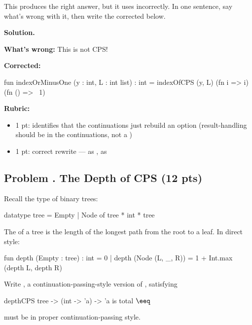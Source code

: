 \documentclass[crop=false]{standalone}
\newif\ifsol
\newenvironment{solution}
    {\par\color{solution_color}\begin{framed}\textbf{Solution.}\par}
    {\end{framed}}
\newcommand{\quizproblem}[3]{%
  \needspace{5\baselineskip}%
  \stepcounter{problem}%
  \ifsol
    \subsection*{Problem \arabic{problem}. #1 \hfill \timing{#2} \quad (#3 pts)}%
  \else
    \subsection*{Problem \arabic{problem}. #1 \hfill (#3 pts)}%
  \fi
}
\newcommand{\answerspace}[1]{\ifsol\else\vspace{#1}\par\fi}
\begin{document}
This produces the right answer, but it uses  incorrectly.
In one sentence, say what's wrong with it, then write the corrected
 below.

\answerspace{4.5cm}

\begin{solution}
\textbf{What's wrong:} This is not CPS!

\textbf{Corrected:}
\begin{codeblock}
  fun indexOrMinusOne (y : int, L : int list) : int =
    indexOfCPS (y, L) (fn i => i) (fn () => ~1)
\end{codeblock}

\textbf{Rubric:}
\begin{itemize}
  \item 1 pt: identifies that the continuations just rebuild an option
    (result-handling should be in the continuations, not a )
  \item 1 pt: correct rewrite ---  as ,
     as 
\end{itemize}
\end{solution}


\quizproblem{The Depth of CPS}{10}{12}

Recall the type of binary trees:

\begin{codeblock}
  datatype tree = Empty | Node of tree * int * tree
\end{codeblock}

The  of a tree is the length of the longest path from the root
to a leaf. In direct style:

\begin{codeblock}
  fun depth (Empty : tree) : int = 0
    | depth (Node (L, _, R)) = 1 + Int.max (depth L, depth R)
\end{codeblock}

Write , a continuation-passing-style version of ,
satisfying

\spec
  {depthCPS}
  {tree -> (int -> 'a) -> 'a}
  { is total}
  { $\eeq$ }

\begin{constraint}
   must be in proper continuation-passing style.
\end{constraint}
\end{document}

